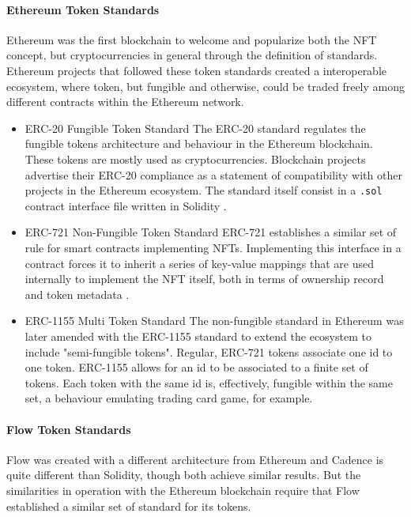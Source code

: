 \documentclass[../main.tex]{subfiles}
\begin{document}
\paragraph{Ethereum Token Standards}
Ethereum was the first blockchain to welcome and popularize both the NFT concept, but cryptocurrencies in general through the definition of standards. Ethereum projects that followed these token standards created a interoperable ecosystem, where token, but fungible and otherwise, could be traded freely among different contracts within the Ethereum network.
\begin{itemize}
    \item{ERC-20 Fungible Token Standard} The ERC-20 standard regulates the fungible tokens architecture and behaviour in the Ethereum blockchain. These tokens are mostly used as cryptocurrencies. Blockchain projects advertise their ERC-20 compliance as a statement of compatibility with other projects in the Ethereum ecosystem. The standard itself consist in a \verb|.sol| contract interface file written in Solidity \cite{ERC20}.

    \item {ERC-721 Non-Fungible Token Standard} ERC-721 establishes a similar set of rule for smart contracts implementing NFTs. Implementing this interface in a contract forces it to inherit a series of key-value mappings that are used internally to implement the NFT itself, both in terms of ownership record and token metadata \cite{ERC721}.

    \item{ERC-1155 Multi Token Standard} The non-fungible standard in Ethereum was later amended with the ERC-1155 standard to extend the ecosystem to include "semi-fungible tokens". Regular, ERC-721 tokens associate one id to one token. ERC-1155 allows for an id to be associated to a finite set of tokens. Each token with the same id is, effectively, fungible within the same set, a behaviour emulating trading card game, for example.
\end{itemize}

\paragraph{Flow Token Standards}
Flow was created with a different architecture from Ethereum and Cadence is quite different than Solidity, though both achieve similar results. But the similarities in operation with the Ethereum blockchain require that Flow established a similar set of standard for its tokens.
\end{document}
